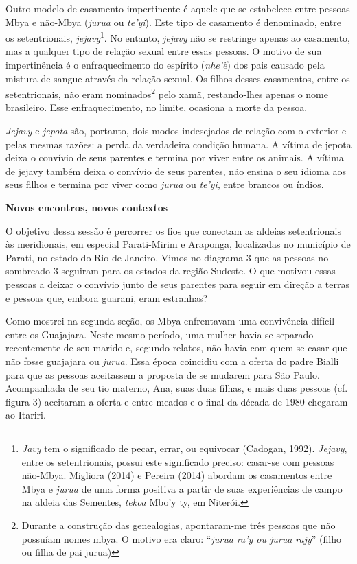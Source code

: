 Outro modelo de casamento impertinente é aquele que se estabelece entre
pessoas Mbya e não-Mbya (\emph{jurua} ou \emph{te'yi}). Este tipo de
casamento é denominado, entre os setentrionais, \emph{jejavy}\footnote{\emph{Javy}
  tem o significado de pecar, errar, ou equivocar (Cadogan, 1992).
  \emph{Jejavy}, entre os setentrionais, possui este significado
  preciso: casar-se com pessoas não-Mbya. Migliora (2014) e Pereira
  (2014) abordam os casamentos entre Mbya e \emph{jurua} de uma forma
  positiva a partir de suas experiências de campo na aldeia das
  Sementes, \emph{tekoa} Mbo'y ty, em Niterói.}. No entanto,
\emph{jejavy} não se restringe apenas ao casamento, mas a qualquer tipo
de relação sexual entre essas pessoas. O motivo de sua impertinência é o
enfraquecimento do espírito (\emph{nhe'ë}) dos pais causado pela mistura
de sangue através da relação sexual. Os filhos desses casamentos, entre
os setentrionais, não eram nominados\footnote{Durante a construção das
  genealogias, apontaram-me três pessoas que não possuíam nomes mbya. O
  motivo era claro: ``\emph{jurua ra'y ou jurua rajy}'' (filho ou filha
  de pai jurua)} pelo xamã, restando-lhes apenas o nome brasileiro. Esse
enfraquecimento, no limite, ocasiona a morte da pessoa.

\emph{Jejavy} e \emph{jepota} são, portanto, dois modos indesejados de
relação com o exterior e pelas mesmas razões: a perda da verdadeira
condição humana. A vítima de jepota deixa o convívio de seus parentes e
termina por viver entre os animais. A vítima de jejavy também deixa o
convívio de seus parentes, não ensina o seu idioma aos seus filhos e
termina por viver como \emph{jurua} ou \emph{te'yi}, entre brancos ou
índios.

\textbf{Novos encontros, novos contextos}

O objetivo dessa sessão é percorrer os fios que conectam as aldeias
setentrionais às meridionais, em especial Parati-Mirim e Araponga,
localizadas no município de Parati, no estado do Rio de Janeiro. Vimos
no diagrama 3 que as pessoas no sombreado 3 seguiram para os estados da
região Sudeste. O que motivou essas pessoas a deixar o convívio junto de
seus parentes para seguir em direção a terras e pessoas que, embora
guarani, eram estranhas?

Como mostrei na segunda seção, os Mbya enfrentavam uma convivência
difícil entre os Guajajara. Neste mesmo período, uma mulher havia se
separado recentemente de seu marido e, segundo relatos, não havia com
quem se casar que não fosse guajajara ou \emph{jurua}. Essa época
coincidiu com a oferta do padre Bialli para que as pessoas aceitassem a
proposta de se mudarem para São Paulo. Acompanhada de seu tio materno,
Ana, suas duas filhas, e mais duas pessoas (cf. figura 3) aceitaram a
oferta e entre meados e o final da década de 1980 chegaram ao Itariri.

